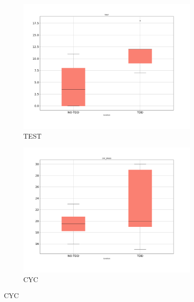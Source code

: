 \begin{figure}[htbp]
    \begin{subfigure}{0.5\textwidth}
        \includegraphics[width=\linewidth]{figures/box_plots/task3/TEST.png}
        \caption{TEST}
        \label{bp_task3_test}
    \end{subfigure}\hfil
    \begin{subfigure}{0.5\textwidth}
        \includegraphics[width=\linewidth]{figures/box_plots/task3/CYC.png}
        \caption{CYC}
        \label{bp_task3_cyc}
    \end{subfigure}

    \medskip


\end{figure}
